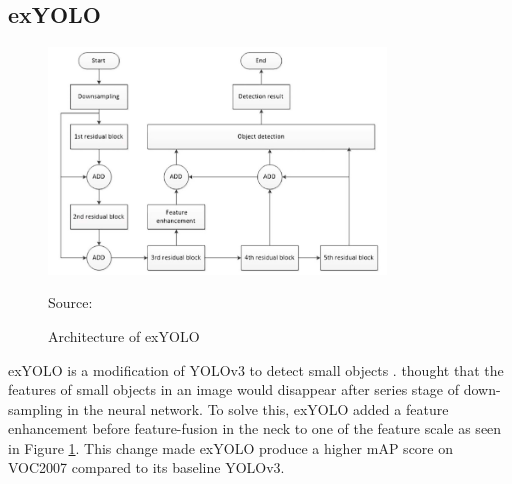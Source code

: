 
  \subsection{exYOLO}
  \begin{figure}[H]
    \centering
    \includegraphics[width=0.8\textwidth]{figures/exyolo.png}
    \caption*{Source: \textcite{exyolo}}
    \caption{Architecture of exYOLO}
    \label{fig:exyolo}
  \end{figure}

  exYOLO is a modification of YOLOv3 to detect small objects \parencite{exyolo}.
  \textcite{exyolo} thought that the features of small objects in an image would disappear
  after series stage of down-sampling in the neural network.
  To solve this, exYOLO added a feature enhancement before feature-fusion in the neck to one of the feature scale as seen in Figure \ref{fig:exyolo}.
  This change made exYOLO produce a higher mAP score on VOC2007 compared to its baseline YOLOv3.

